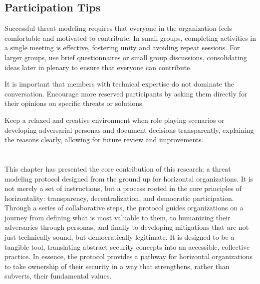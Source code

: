 \subsection{Participation Tips}
\label{subsec:participation_tips}

Successful threat modeling requires that everyone in the organization feels comfortable
and motivated to contribute. In small groups, completing activities in a single meeting is
effective, fostering unity and avoiding repeat sessions. For larger groups, use
brief questionnaires or small group discussions, consolidating ideas later in
plenary to ensure that everyone can contribute.

It is important that members with technical expertise do not dominate the
conversation. Encourage more reserved participants by asking them directly for
their opinions on specific threats or solutions.

Keep a relaxed and creative environment when role playing scenarios or
developing adversarial personas and document decisions transparently,
explaining the reasons clearly, allowing for future review and improvements.

\section*{}
This chapter has presented the core contribution of this research: a threat
modeling protocol designed from the ground up for horizontal organizations. It
is not merely a set of instructions, but a process rooted in the core principles
of horizontality: transparency, decentralization, and democratic participation.
Through a series of collaborative steps, the protocol guides organizations on a
journey from defining what is most valuable to them, to humanizing their
adversaries through personas, and finally to developing mitigations that are not
just technically sound, but democratically legitimate. It is designed to be a
tangible tool, translating abstract security concepts into an accessible,
collective practice. In essence, the protocol provides a pathway for horizontal
organizations to take ownership of their security in a way that strengthens,
rather than subverts, their fundamental values.